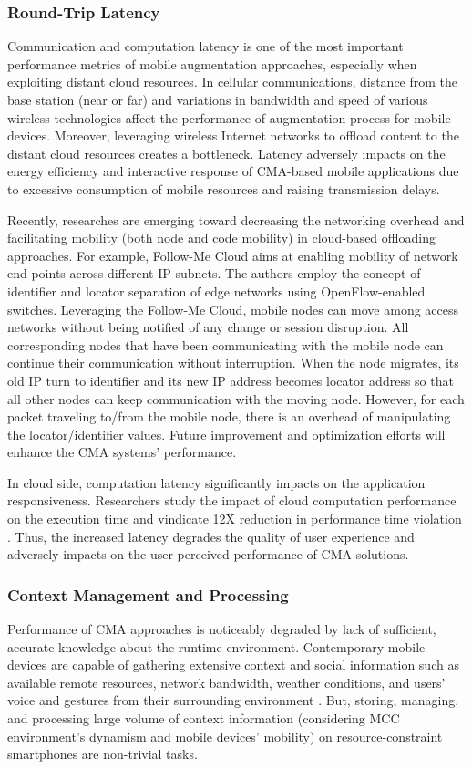 \documentclass[publish]{IEEEtran}
\begin{document}
\subsubsection{Round-Trip Latency}
Communication and computation latency is one of the most important performance metrics of mobile augmentation approaches, especially when exploiting distant cloud resources. In cellular communications, distance from the base station (near or far) and variations in bandwidth and speed of various wireless technologies affect the performance of augmentation process for mobile devices. Moreover, leveraging wireless Internet networks to offload content to the distant cloud resources creates a bottleneck. Latency adversely impacts on the energy efficiency \cite{Miettinen2010} and interactive response \cite{Lagar-Cavilla} of CMA-based mobile applications due to excessive consumption of mobile resources and raising transmission delays.

Recently, researches \cite{Bifulco2012, Johansson2012} are emerging toward decreasing the networking overhead and facilitating mobility (both node and code mobility) in cloud-based offloading approaches. For example, Follow-Me Cloud \cite{Bifulco2012} aims at enabling mobility of network end-points across different IP subnets. The authors employ the concept of identifier and locator separation of edge networks using OpenFlow-enabled switches. Leveraging the Follow-Me Cloud, mobile nodes can move among access networks without being notified of any change or session disruption. All corresponding nodes that have been communicating with the mobile node can continue their communication without interruption. When the node migrates, its old IP turn to identifier and its new IP address becomes locator address so that all other nodes can keep communication with the moving node. However, for each packet traveling to/from the mobile node, there is an overhead of manipulating  the locator/identifier values. Future improvement and optimization efforts will enhance the CMA systems' performance.
 
 In cloud side, computation latency significantly impacts on the application responsiveness. Researchers study the impact of cloud computation performance on the execution time and vindicate 12X reduction in performance time violation \cite{Guevara2013}. Thus, the increased latency degrades the quality of user experience and adversely impacts on the user-perceived performance of CMA solutions.

\subsubsection{Context Management and Processing} 
Performance of CMA approaches is noticeably degraded by lack of sufficient, accurate knowledge about the runtime environment. Contemporary mobile devices are capable of gathering extensive context and social information such as available remote resources, network bandwidth, weather conditions, and users' voice and gestures from their surrounding environment \cite{Lane2010,Lukowicz2012}. But, storing, managing, and processing large volume of context information (considering MCC environment's dynamism and mobile devices' mobility) on resource-constraint smartphones are non-trivial tasks.
\end{document}
